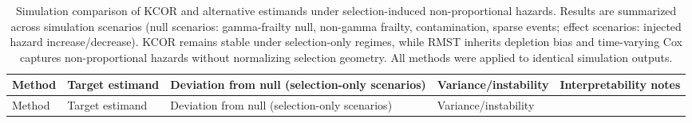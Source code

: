 \documentclass[
]{article}
\begin{document}
\begin{longtable}[]{@{}
  >{\raggedright\arraybackslash}p{}
  >{\raggedright\arraybackslash}p{}
  >{\raggedright\arraybackslash}p{}
  >{\raggedright\arraybackslash}p{}
  >{\raggedright\arraybackslash}p{}@{}}
\caption{Simulation comparison of KCOR and alternative estimands under
selection-induced non-proportional hazards. Results are summarized
across simulation scenarios (null scenarios: gamma-frailty null,
non-gamma frailty, contamination, sparse events; effect scenarios:
injected hazard increase/decrease). KCOR remains stable under
selection-only regimes, while RMST inherits depletion bias and
time-varying Cox captures non-proportional hazards without normalizing
selection geometry. All methods were applied to identical simulation
outputs.}\label{tbl:comparison_estimands}\tabularnewline
\toprule\noalign{}
\begin{minipage}[b]{\linewidth}\raggedright
Method
\end{minipage} & \begin{minipage}[b]{\linewidth}\raggedright
Target estimand
\end{minipage} & \begin{minipage}[b]{\linewidth}\raggedright
Deviation from null (selection-only scenarios)
\end{minipage} & \begin{minipage}[b]{\linewidth}\raggedright
Variance/instability
\end{minipage} & \begin{minipage}[b]{\linewidth}\raggedright
Interpretability notes
\end{minipage} \\
\midrule\noalign{}
\endfirsthead
\toprule\noalign{}
\begin{minipage}[b]{\linewidth}\raggedright
Method
\end{minipage} & \begin{minipage}[b]{\linewidth}\raggedright
Target estimand
\end{minipage} & \begin{minipage}[b]{\linewidth}\raggedright
Deviation from null (selection-only scenarios)
\end{minipage} & \begin{minipage}[b]{\linewidth}\raggedright
Variance/instability
\end{minipage} & \begin{minipage}[b]{\linewidth}\raggedright

\end{minipage}
\end{longtable}
\end{document}
